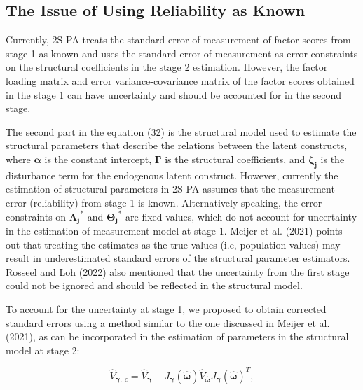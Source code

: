 \documentclass[
  11pt,
  man]{apa6}
\begin{document}
\hypertarget{the-issue-of-using-reliability-as-known}{%
\subsection{The Issue of Using Reliability as Known}\label{the-issue-of-using-reliability-as-known}}

Currently, 2S-PA treats the standard error of measurement of factor scores from stage 1 as known and uses the standard error of measurement as error-constraints on the structural coefficients in the stage 2 estimation. However, the factor loading matrix and error variance-covariance matrix of the factor scores obtained in the stage 1 can have uncertainty and should be accounted for in the second stage.

The second part in the equation (32) is the structural model used to estimate the structural parameters that describe the relations between the latent constructs, where \(\boldsymbol{\alpha}\) is the constant intercept, \(\boldsymbol{\Gamma}\) is the structural coefficients, and \(\boldsymbol{\zeta_{j}}\) is the disturbance term for the endogenous latent construct. However, currently the estimation of structural parameters in 2S-PA assumes that the measurement error (reliability) from stage 1 is known. Alternatively speaking, the error constraints on \(\boldsymbol{\Lambda_{j}}^\text{*}\) and \(\boldsymbol{\Theta_{j}}^\text{*}\) are fixed values, which do not account for uncertainty in the estimation of measurement model at stage 1. Meijer et al. (2021) points out that treating the estimates as the true values (i.e, population values) may result in underestimated standard errors of the structural parameter estimators. Rosseel and Loh (2022) also mentioned that the uncertainty from the first stage could not be ignored and should be reflected in the structural model.

To account for the uncertainty at stage 1, we proposed to obtain corrected standard errors using a method similar to the one discussed in Meijer et al. (2021), as can be incorporated in the estimation of parameters in the structural model at stage 2:

\begin{equation}
\hat{V}_{\boldsymbol{\gamma},\ c} = \hat{V}_{\boldsymbol{\gamma}} + J_{\boldsymbol{\gamma}}(\hat{\boldsymbol{\omega}})\hat{V}_{\boldsymbol{\hat{\boldsymbol{\omega}}}}J_{\boldsymbol{\gamma}}(\hat{\boldsymbol{\omega}})^T,
\end{equation}
\end{document}
